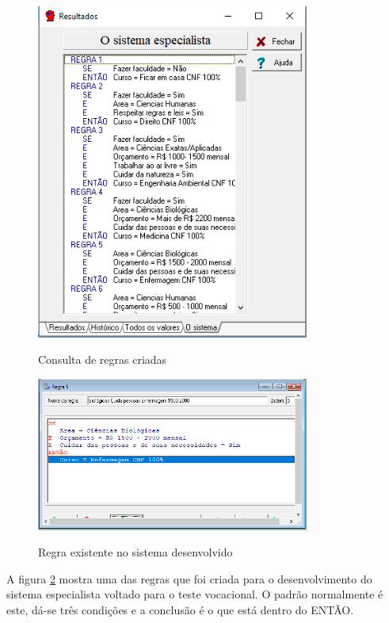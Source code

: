 \begin{figure}[H]
    \centering
    \caption{Consulta de regras criadas}
    \includegraphics[width=0.8\textwidth]{regras2.PNG}
    \label{regras2}
\end{figure}

\begin{figure}[H]
    \centering
    \caption{Regra existente no sistema desenvolvido}
    \includegraphics[width=0.8\textwidth]{regras.PNG}
    \label{regras}
\end{figure}
A figura \ref{regras} mostra uma das regras que foi criada para o desenvolvimento do sistema especialista voltado para o teste vocacional. O padrão normalmente é este, dá-se três condições e a conclusão é o que está dentro do ENTÃO.
 
